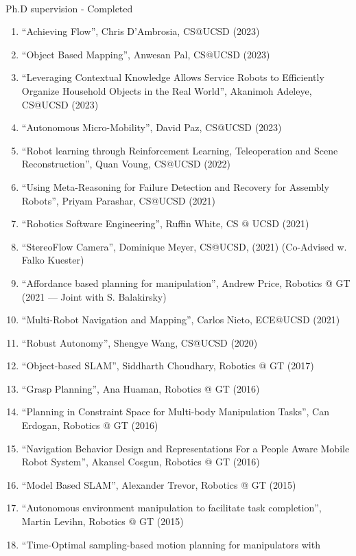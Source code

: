 \documentclass{article}
\begin{document}
\begin{cv}
\begin{cvlist}{~}
\item[Ph.D supervision - Completed]\ \\
  \begin{enumerate}
    \item ``Achieving Flow'', Chris D'Ambrosia, CS@UCSD (2023)
    \item ``Object Based Mapping'', Anwesan Pal, CS@UCSD (2023)
    \item ``Leveraging Contextual Knowledge Allows Service Robots to Efficiently
          Organize Household Objects in the Real World'', Akanimoh Adeleye,
          CS@UCSD (2023)
    \item ``Autonomous Micro-Mobility'', David Paz, CS@UCSD (2023)
    \item ``Robot learning through Reinforcement Learning, Teleoperation
        and Scene Reconstruction'', Quan Voung, CS@UCSD (2022)
    \item ``Using Meta-Reasoning for Failure Detection and Recovery for
          Assembly Robots'', Priyam Parashar, CS@UCSD (2021)
    \item ``Robotics Software Engineering'', Ruffin White, CS @ UCSD (2021)
    \item ``StereoFlow Camera'', Dominique Meyer, CS@UCSD, (2021)
          (Co-Advised w. Falko Kuester)
    \item ``Affordance based planning for manipulation'', Andrew Price, Robotics
          @ GT (2021 --- Joint with S. Balakirsky)
    \item ``Multi-Robot Navigation and Mapping'', Carlos Nieto, ECE@UCSD (2021)
    \item ``Robust Autonomy'', Shengye Wang, CS@UCSD (2020)
    \item ``Object-based SLAM'', Siddharth Choudhary, Robotics @ GT (2017)
    \item ``Grasp Planning'', Ana Huaman, Robotics @ GT (2016)
    \item ``Planning in Constraint Space for Multi-body Manipulation Tasks'',
          Can Erdogan, Robotics @ GT (2016)
    \item ``Navigation Behavior Design and Representations For a People Aware
          Mobile Robot System'', Akansel Cosgun, Robotics @ GT (2016)
    \item ``Model Based SLAM'', Alexander Trevor, Robotics @ GT (2015)
    \item ``Autonomous environment manipulation to facilitate task completion'',
          Martin Levihn, Robotics @ GT (2015)
    \item ``Time-Optimal sampling-based motion planning for manipulators with

\end{enumerate}
\end{cvlist}
\end{cv}
\end{document}
